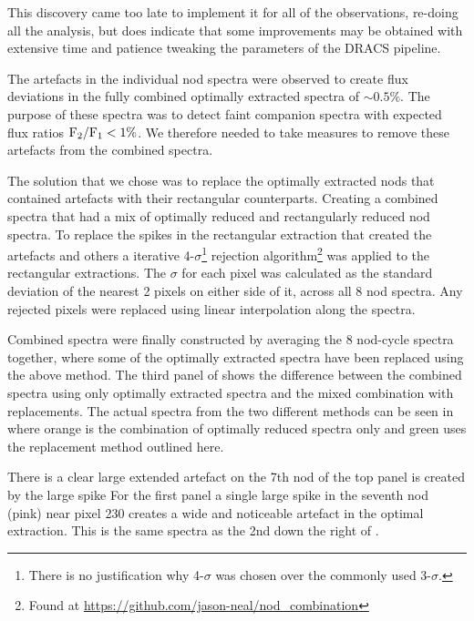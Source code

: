 This discovery came too late to implement it for all of the observations, re-doing all the analysis, but does indicate that some improvements may be obtained with extensive time and patience tweaking the parameters of the {DRACS} pipeline.


The artefacts in the individual nod spectra were observed to create flux deviations in the fully combined optimally extracted spectra of \(\sim 0.5\%\). The purpose of these spectra was to detect faint companion spectra with expected flux ratios \(\rm {F_2}/{F_1} < 1\%\). We therefore needed to take measures to remove these artefacts from the combined spectra.

The solution that we chose was to replace the optimally extracted nods that contained artefacts with their rectangular counterparts. Creating a combined spectra that had a mix of optimally reduced and rectangularly reduced nod spectra.
To replace the spikes in the rectangular extraction that created the artefacts and others a iterative 4-\(\sigma\)\footnote{There is no justification why 4-\(\sigma\) was chosen over the commonly used 3-\(\sigma\).} rejection algorithm\footnote{Found at \url{https://github.com/jason-neal/nod_combination}} was applied to the rectangular extractions. The \(\sigma\) for each pixel was calculated as the standard deviation of the nearest 2 pixels on either side of it, across all 8 nod spectra. Any rejected pixels were replaced using linear interpolation along the spectra.


Combined spectra were finally constructed by averaging the 8 nod-cycle spectra together, where some of the optimally extracted spectra have been replaced using the above method. The third panel of  shows the difference between the combined spectra using only optimally extracted spectra and the mixed combination with replacements. The actual spectra from the two different methods can be seen in  where orange is the combination of optimally reduced spectra only and green uses the replacement method outlined here.

There is a clear large extended artefact on the 7th nod of the top panel is created by the large spike For the first panel a single large spike in the seventh nod (pink) near pixel 230 creates a wide and noticeable artefact in the optimal extraction. This is the same spectra as the 2nd down the right of .



